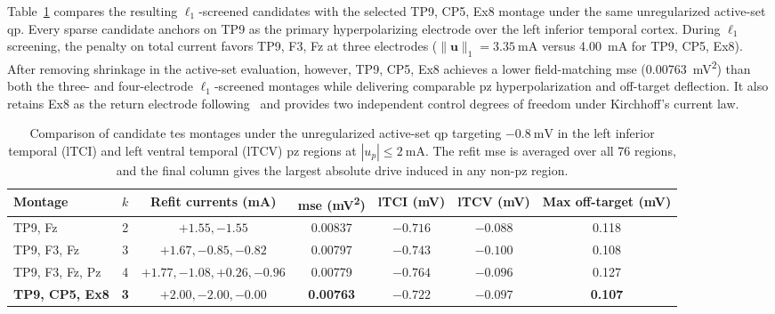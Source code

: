 Table~\ref{tab:montage_comparison} compares the resulting $\ell_1$-screened candidates with the selected TP9, CP5, Ex8 montage under the same unregularized active-set \ac{qp}.
Every sparse candidate anchors on TP9 as the primary hyperpolarizing electrode over the left inferior temporal cortex.
During $\ell_1$ screening, the penalty on total current favors TP9, F3, Fz at three electrodes ($\lVert\mathbf{u}\rVert_1=\SI{3.35}{\milli\ampere}$ versus \SI{4.00}{\milli\ampere} for TP9, CP5, Ex8).
After removing shrinkage in the active-set evaluation, however, TP9, CP5, Ex8 achieves a lower field-matching \ac{mse} (\SI{0.00763}{\milli\volt\squared}) than both the three- and four-electrode $\ell_1$-screened montages while delivering comparable \ac{pz} hyperpolarization and off-target deflection.
It also retains Ex8 as the return electrode following~\cite{Yu2024} and provides two independent control degrees of freedom under Kirchhoff's current law.

\begin{table}[!htbp] %
  \centering
  \small
  \setlength{\tabcolsep}{4.5pt}
  \caption{Comparison of candidate \ac{tes} montages under the unregularized active-set \ac{qp} targeting $-\SI{0.8}{\milli\volt}$ in the left inferior temporal (lTCI) and left ventral temporal (lTCV) \ac{pz} regions at $|u_p|\le\SI{2}{\milli\ampere}$.
  The refit \ac{mse} is averaged over all \num{76} regions, and the final column gives the largest absolute drive induced in any non-\ac{pz} region.}\label{tab:montage_comparison}
  \begin{tabular}{@{}lcccccc@{}}
    \toprule
    Montage & $k$ & Refit currents (\si{\milli\ampere}) & \ac{mse} (\si{\milli\volt\squared}) & lTCI (\si{\milli\volt}) & lTCV (\si{\milli\volt}) & Max off-target (\si{\milli\volt}) \\
    \midrule
    TP9, Fz          & 2 & $+1.55, -1.55$               & 0.00837 & $-0.716$ & $-0.088$ & 0.118 \\
    TP9, F3, Fz      & 3 & $+1.67, -0.85, -0.82$        & 0.00797 & $-0.743$ & $-0.100$ & 0.108 \\
    TP9, F3, Fz, Pz  & 4 & $+1.77, -1.08, +0.26, -0.96$ & 0.00779 & $-0.764$ & $-0.096$ & 0.127 \\
    \textbf{TP9, CP5, Ex8} & \textbf{3} & $+2.00, -2.00, -0.00$ & \textbf{0.00763} & $-0.722$ & $-0.097$ & \textbf{0.107} \\
    \bottomrule
  \end{tabular}
\end{table}


